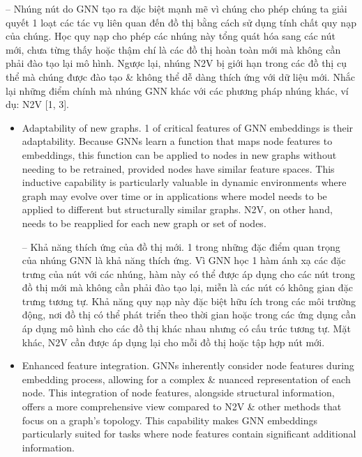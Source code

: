 \documentclass{article}
\begin{document}
\begin{itemize}
\begin{itemize}
\begin{itemize}
           -- Nhúng nút do GNN tạo ra đặc biệt mạnh mẽ vì chúng cho phép chúng ta giải quyết 1 loạt các tác vụ liên quan đến đồ thị bằng cách sử dụng tính chất quy nạp của chúng. Học quy nạp cho phép các nhúng này tổng quát hóa sang các nút mới, chưa từng thấy hoặc thậm chí là các đồ thị hoàn toàn mới mà không cần phải đào tạo lại mô hình. Ngược lại, nhúng N2V bị giới hạn trong các đồ thị cụ thể mà chúng được đào tạo \& không thể dễ dàng thích ứng với dữ liệu mới. Nhắc lại những điểm chính mà nhúng GNN khác với các phương pháp nhúng khác, ví dụ: N2V [1, 3].
           \begin{itemize}
               \item {\sf Adaptability of new graphs.} 1 of critical features of GNN embeddings is their adaptability. Because GNNs learn a function that maps node features to embeddings, this function can be applied to nodes in new graphs without needing to be retrained, provided nodes have similar feature spaces. This inductive capability is particularly valuable in dynamic environments where graph may evolve over time or in applications where model needs to be applied to different but structurally similar graphs. N2V, on other hand, needs to be reapplied for each new graph or set of nodes.

               -- {\sf Khả năng thích ứng của đồ thị mới.} 1 trong những đặc điểm quan trọng của nhúng GNN là khả năng thích ứng. Vì GNN học 1 hàm ánh xạ các đặc trưng của nút với các nhúng, hàm này có thể được áp dụng cho các nút trong đồ thị mới mà không cần phải đào tạo lại, miễn là các nút có không gian đặc trưng tương tự. Khả năng quy nạp này đặc biệt hữu ích trong các môi trường động, nơi đồ thị có thể phát triển theo thời gian hoặc trong các ứng dụng cần áp dụng mô hình cho các đồ thị khác nhau nhưng có cấu trúc tương tự. Mặt khác, N2V cần được áp dụng lại cho mỗi đồ thị hoặc tập hợp nút mới.
               \item {\sf Enhanced feature integration.} GNNs inherently consider node features during embedding process, allowing for a complex \& nuanced representation of each node. This integration of node features, alongside structural information, offers a more comprehensive view compared to N2V \& other methods that focus on a graph's topology. This capability makes GNN embeddings particularly suited for tasks where node features contain significant additional information.


\end{itemize}
\end{itemize}
\end{itemize}
\end{itemize}
\end{document}
